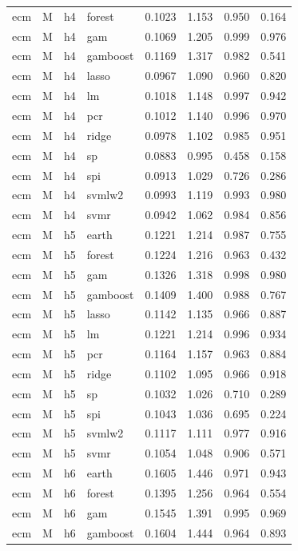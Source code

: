 \begin{ThreePartTable}
\begin{longtable}[t]{llclcccc}
ecm & M & h4 & forest & 0.1023 & 1.153 & 0.950 & 0.164\\
ecm & M & h4 & gam & 0.1069 & 1.205 & 0.999 & 0.976\\
ecm & M & h4 & gamboost & 0.1169 & 1.317 & 0.982 & 0.541\\
ecm & M & h4 & lasso & 0.0967 & 1.090 & 0.960 & 0.820\\
ecm & M & h4 & lm & 0.1018 & 1.148 & 0.997 & 0.942\\
ecm & M & h4 & pcr & 0.1012 & 1.140 & 0.996 & 0.970\\
ecm & M & h4 & ridge & 0.0978 & 1.102 & 0.985 & 0.951\\
ecm & M & h4 & sp & 0.0883 & 0.995 & 0.458 & 0.158\\
ecm & M & h4 & spi & 0.0913 & 1.029 & 0.726 & 0.286\\
ecm & M & h4 & svmlw2 & 0.0993 & 1.119 & 0.993 & 0.980\\
ecm & M & h4 & svmr & 0.0942 & 1.062 & 0.984 & 0.856\\
\addlinespace
ecm & M & h5 & earth & 0.1221 & 1.214 & 0.987 & 0.755\\
ecm & M & h5 & forest & 0.1224 & 1.216 & 0.963 & 0.432\\
ecm & M & h5 & gam & 0.1326 & 1.318 & 0.998 & 0.980\\
ecm & M & h5 & gamboost & 0.1409 & 1.400 & 0.988 & 0.767\\
ecm & M & h5 & lasso & 0.1142 & 1.135 & 0.966 & 0.887\\
ecm & M & h5 & lm & 0.1221 & 1.214 & 0.996 & 0.934\\
ecm & M & h5 & pcr & 0.1164 & 1.157 & 0.963 & 0.884\\
ecm & M & h5 & ridge & 0.1102 & 1.095 & 0.966 & 0.918\\
ecm & M & h5 & sp & 0.1032 & 1.026 & 0.710 & 0.289\\
ecm & M & h5 & spi & 0.1043 & 1.036 & 0.695 & 0.224\\
ecm & M & h5 & svmlw2 & 0.1117 & 1.111 & 0.977 & 0.916\\
ecm & M & h5 & svmr & 0.1054 & 1.048 & 0.906 & 0.571\\
\addlinespace
ecm & M & h6 & earth & 0.1605 & 1.446 & 0.971 & 0.943\\
ecm & M & h6 & forest & 0.1395 & 1.256 & 0.964 & 0.554\\
ecm & M & h6 & gam & 0.1545 & 1.391 & 0.995 & 0.969\\
ecm & M & h6 & gamboost & 0.1604 & 1.444 & 0.964 & 0.893\\

\end{longtable}
\end{ThreePartTable}

